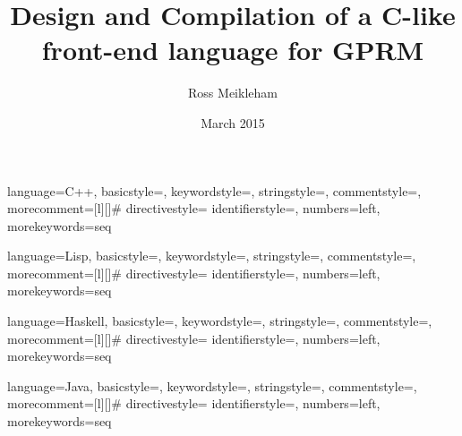 \documentclass{l4proj}
\begin{document}
 {language=C++,
                basicstyle=\ttfamily,
                keywordstyle=\color{blue}\ttfamily,
                stringstyle=\color{red}\ttfamily,
                commentstyle=\color{gray}\ttfamily,
                morecomment=[l][\color{magenta}]{\#}
                directivestyle={\color{green}}
                identifierstyle=\color{purple},
                numbers=left,
                morekeywords={seq}
}


 {language=Lisp,
                basicstyle=\ttfamily,
                keywordstyle=\color{blue}\ttfamily,
                stringstyle=\color{red}\ttfamily,
                commentstyle=\color{gray}\ttfamily,
                morecomment=[l][\color{magenta}]{\#}
                directivestyle={\color{green}}
                identifierstyle=\color{purple},
                numbers=left,
                morekeywords={seq}
}

 {language=Haskell,
                basicstyle=\ttfamily,
                keywordstyle=\color{blue}\ttfamily,
                stringstyle=\color{red}\ttfamily,
                commentstyle=\color{gray}\ttfamily,
                morecomment=[l][\color{magenta}]{\#}
                directivestyle={\color{green}}
                identifierstyle=\color{purple},
                numbers=left,
                morekeywords={seq}
}

 {language=Java,
                basicstyle=\ttfamily,
                keywordstyle=\color{blue}\ttfamily,
                stringstyle=\color{red}\ttfamily,
                commentstyle=\color{gray}\ttfamily,
                morecomment=[l][\color{magenta}]{\#}
                directivestyle={\color{green}}
                identifierstyle=\color{purple},
                numbers=left,
                morekeywords={seq}
}

\title{Design and Compilation of a C-like front-end language for GPRM}
\author{Ross Meikleham}
\date{March 2015}
\maketitle


\begin{abstract}

\end{abstract}

\educationalconsent

\tableofcontents
\
\setlength{\parindent}{0pt}








\begin{appendices}
\end{appendices}




\end{document}
